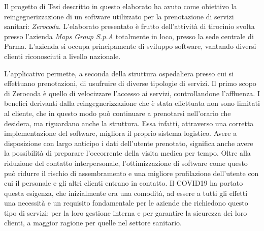 \documentclass[a4paper,11pt]{article}
\begin{document}
	\maketitle
	   Il progetto di Tesi descritto in questo elaborato ha avuto come obiettivo la reingegnerizzazione di un software utilizzato per la prenotazione di servizi sanitari: \emph{Zerocoda}. L'elaborato presentato è frutto dell'attività di tirocinio svolta presso l'azienda \emph{Maps Group S.p.A} totalmente in loco, presso la sede centrale di Parma. L'azienda si occupa principamente di sviluppo software, vantando diversi clienti riconosciuti a livello nazionale.
	   
	   L'applicativo permette, a seconda della struttura ospedaliera presso cui si effettuano prenotazioni, di usufruire di diverse tipologie di servizi. Il primo scopo di Zerocoda è quello di velocizzare l'accesso ai servizi, controllandone l’affluenza. I benefici derivanti dalla reingegnerizzazione che è stata effettuata non sono limitati al cliente, che in questo modo può continuare a prenotarsi nell'orario che desidera, ma riguardano anche la struttura. Essa infatti, attraverso una corretta implementazione del software, migliora il proprio sistema logistico. Avere a disposizione con largo anticipo i dati dell'utente prenotato, significa anche avere la possibilità di preparare l'occorrente della visita medica per tempo. Oltre alla riduzione del contatto interpersonale, l’ottimizzazione di software come questo può ridurre il rischio di assembramento e una migliore profilazione dell’utente con cui il personale e gli altri clienti entrano in contatto. Il COVID19 ha portato questa esigenza, che inizialmente era una comodità, ad essere a tutti gli effetti una necessità e un requisito fondamentale per le aziende che richiedono questo tipo di servizi: per la loro gestione interna e per garantire la sicurezza dei loro clienti, a maggior ragione per quelle nel settore sanitario. 
	   
\end{document}
